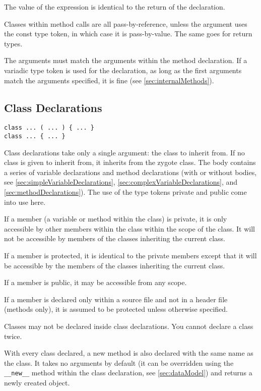 \documentclass[10pt,a4paper]{article}
\begin{document}
The value of the expression is identical to the return of the declaration.

Classes within method calls are all pass-by-reference, unless the argument uses the const type token, in which case it is pass-by-value. The same goes for return types. 

The arguments must match the arguments within the method declaration. If a variadic type token is used for the declaration, as long as the first arguments match the arguments specified, it is fine (see \ref{sec:internalMethods}).

\subsection{Class Declarations}
\begin{verbatim}
class ... ( ... ) { ... }
class ... { ... }
\end{verbatim}

Class declarations take only a single argument: the class to inherit from. If no class is given to inherit from, it inherits from the zygote class. The body contains a series of variable declarations and method declarations (with or without bodies, see \ref{sec:simpleVariableDeclarations}, \ref{sec:complexVariableDeclarations}, and \ref{sec:methodDeclarations}). The use of the type tokens private and public come into use here.

If a member (a variable or method within the class) is private, it is only accessible by other members within the class within the scope of the class. It will not be accessible by members of the classes inheriting the current class.

If a member is protected, it is identical to the private members except that it will be accessible by the members of the classes inheriting the current class.

If a member is public, it may be accessible from any scope. 

If a member is declared only within a source file and not in a header file (methods only), it is assumed to be protected unless otherwise specified.

Classes may not be declared inside class declarations. You cannot declare a class twice.

With every class declared, a new method is also declared with the same name as the class. It takes no arguments by default (it can be overridden using the \verb|__new__| method within the class declaration, see \ref{sec:dataModel}) and returns a newly created object.
\end{document}
